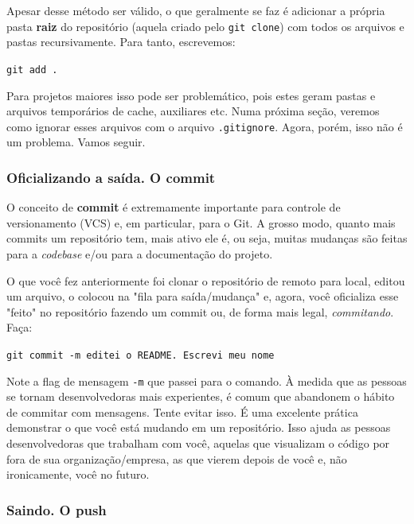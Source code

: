\documentclass{article}
\begin{document}
  Apesar desse método ser válido, o que geralmente se faz é adicionar a própria pasta \textbf{raiz} do repositório (aquela criado pelo \texttt{git clone})
  com todos os arquivos e pastas recursivamente. Para tanto, escrevemos: 

  \vspace{1ex}
  \texttt{git add .}
  \vspace{1ex}

  Para projetos maiores isso pode ser problemático, pois estes geram pastas e arquivos temporários de cache, auxiliares etc. Numa próxima
  seção, veremos como ignorar esses arquivos com o arquivo \texttt{.gitignore}. Agora, porém, isso não é um problema. 
  Vamos seguir. 

  \subsubsection{Oficializando a saída. O commit}

  O conceito de \textbf{commit} é extremamente importante para controle de versionamento (VCS) e, em particular, para o Git. 
  A grosso modo, quanto mais commits um repositório tem, mais ativo ele é, ou seja, muitas mudanças são feitas para a \textit{codebase}
  e/ou para a documentação do projeto.

  O que você fez anteriormente foi clonar o repositório de remoto para local, editou um arquivo, 
  o colocou na "fila para saída/mudança" e, agora, você oficializa esse "feito" no repositório fazendo um commit ou,
  de forma mais legal, \textit{commitando}. Faça: 

  \vspace{1ex}
  \texttt{git commit -m \textquotesingle\!\textquotesingle editei o README. Escrevi meu nome\textquotesingle\!\textquotesingle}
  \vspace{1ex}

  Note a flag de mensagem \texttt{-m} que passei para o comando. À medida que as pessoas se tornam desenvolvedoras mais experientes, 
  é comum que abandonem o hábito de commitar com mensagens. Tente evitar isso. É uma excelente prática demonstrar o que você está 
  mudando em um repositório. Isso ajuda as pessoas desenvolvedoras que trabalham com você, aquelas que visualizam o código por fora
  de sua organização/empresa, as que vierem depois de você e, não ironicamente, você no futuro. 

  \subsubsection{Saindo. O push}
  \label{sec:push}
\end{document}
